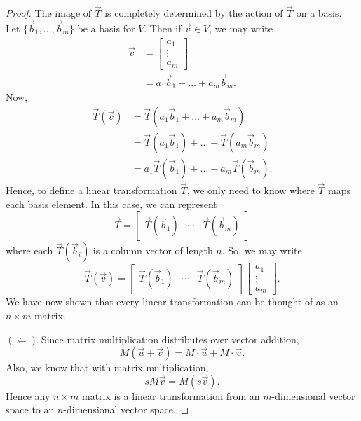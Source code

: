 \documentclass{ximera}
\begin{document}
\begin{lemma}
\begin{proof}
    The image of $\vec{T}$ is completely determined by the action of
    $\vec{T}$ on a basis. Let $\{\vec{b}_1,\dots,\vec{b}_m\}$ be a
    basis for $V$. Then if $\vec{v}\in V$, we may write
    \begin{align*}
      \vec{v} &= \begin{bmatrix}
        a_1\\
        \vdots \\
        a_m
        \end{bmatrix}\\
      &=a_1\vec{b}_1 + \dots + a_m\vec{b}_m.
    \end{align*}
    Now,
    \begin{align*}
      \vec{T}(\vec{v})&=\vec{T}(a_1\vec{b}_1 + \dots + a_m\vec{b}_m)\\
      &= \vec{T}(a_1\vec{b}_1) + \dots + \vec{T}(a_m\vec{b}_m) \\
      &= a_1\vec{T}(\vec{b}_1) + \dots + a_m\vec{T}(\vec{b}_m).
    \end{align*}
    Hence, to define a linear transformation $\vec{T}$, we only need
    to know where $\vec{T}$ maps each basis element. In this case, we
    can represent
    \[
    \vec{T} = \begin{bmatrix}
      \vec{T}(\vec{b}_1) & \cdots & \vec{T}(\vec{b}_m)
    \end{bmatrix}
    \]
    where each $\vec{T}(\vec{b}_i)$ is a column vector of length $n$.
    So, we may write
    \[
    \vec{T}(\vec{v}) = \begin{bmatrix}
      \vec{T}(\vec{b}_1) & \cdots & \vec{T}(\vec{b}_m)
    \end{bmatrix} \begin{bmatrix}
        a_1\\
        \vdots \\
        a_m
        \end{bmatrix}.
    \]
    We have now shown that every linear transformation can be thought
    of as an $n\times m$ matrix.

      $(\Leftarrow)$ Since matrix multiplication distributes over
      vector addition,
      \[
      M(\vec{u}+\vec{v})  = M\cdot \vec{u} + M\cdot \vec{v}.
      \]
      Also, we know that with matrix multiplication,
      \[
      s M \vec{v} = M(s\vec{v}).
      \]
      Hence any $n\times m$ matrix is a linear transformation from an
      $m$-dimensional vector space to an $n$-dimensional vector
      space.
  \end{proof}
\end{lemma}
\end{document}
